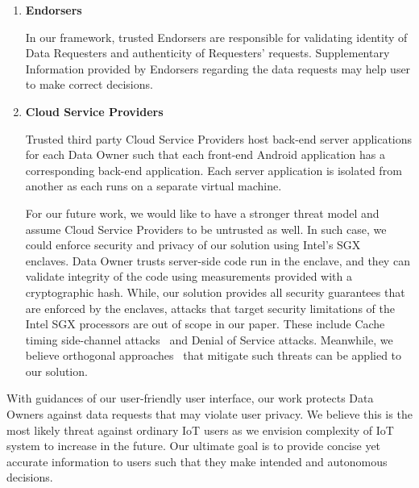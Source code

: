 \begin{enumerate}
\item \textbf {Endorsers}

In our framework, trusted Endorsers are responsible for validating identity of Data Requesters and authenticity of Requesters' requests. Supplementary Information provided by Endorsers regarding the data requests may help user to make correct decisions.

\item \textbf {Cloud Service Providers}

Trusted third party Cloud Service Providers host back-end server applications for each Data Owner such that each front-end Android application has a corresponding back-end application. Each server application is isolated from another as each runs on a separate virtual machine. 

For our future work, we would like to have a stronger threat model and assume Cloud Service Providers to be untrusted as well. In such case, we could enforce security and privacy of our solution using Intel's SGX~\cite{enclave} enclaves. Data Owner trusts server-side code run in the enclave, and they can validate integrity of the code using measurements provided with a cryptographic hash. While, our solution provides all security guarantees that are enforced by the enclaves, attacks that target security limitations of the Intel SGX processors are out of scope in our paper. These include Cache timing side-channel attacks~\cite{leaky} and Denial of Service attacks. Meanwhile, we believe orthogonal approaches~\cite{mengjia,raccoon} that mitigate such threats can be applied to our solution. 
\end{enumerate}

With guidances of our user-friendly user interface, our work protects Data Owners against data requests that may violate user privacy. We believe this is the most likely threat against ordinary IoT users as we envision complexity of IoT system to increase in the future. Our ultimate goal is to provide concise yet accurate information to users such that they make intended and autonomous decisions.